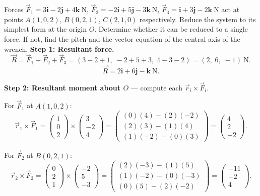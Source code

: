 \documentclass[11pt]{article}
\begin{document}
\begin{exoresolu}
Forces $\vec{F}_1 = 3\mathbf{i} - 2\mathbf{j} + 4\mathbf{k}\ \mathrm{N}$, $\vec{F}_2 = -2\mathbf{i} + 5\mathbf{j} - 3\mathbf{k}\ \mathrm{N}$, $\vec{F}_3 = \mathbf{i} + 3\mathbf{j} - 2\mathbf{k}\ \mathrm{N}$ act at points $A(1,0,2)$, $B(0,2,1)$, $C(2,1,0)$ respectively. Reduce the system to its simplest form at the origin $O$. Determine whether it can be reduced to a single force. If not, find the pitch and the vector equation of the central axis of the wrench.
\tcblower
\textbf{Step 1: Resultant force.}
\[
\vec{R} = \vec{F}_1 + \vec{F}_2 + \vec{F}_3 = (3 - 2 + 1,\; -2 + 5 + 3,\; 4 - 3 - 2) = (2,\; 6,\; -1)\ \mathrm{N}.
\]
\[
\vec{R} = 2\mathbf{i} + 6\mathbf{j} - \mathbf{k}\ \mathrm{N}.
\]

\textbf{Step 2: Resultant moment about $O$} — compute each $\vec{r}_i \times \vec{F}_i$.

For $\vec{F}_1$ at $A(1,0,2)$:
\[
\vec{r}_1 \times \vec{F}_1 =
\begin{pmatrix} 1 \\ 0 \\ 2 \end{pmatrix} \times
\begin{pmatrix} 3 \\ -2 \\ 4 \end{pmatrix} =
\begin{pmatrix} (0)(4)-(2)(-2) \\ (2)(3)-(1)(4) \\ (1)(-2)-(0)(3) \end{pmatrix} =
\begin{pmatrix} 4 \\ 2 \\ -2 \end{pmatrix}.
\]

For $\vec{F}_2$ at $B(0,2,1)$:
\[
\vec{r}_2 \times \vec{F}_2 =
\begin{pmatrix} 0 \\ 2 \\ 1 \end{pmatrix} \times
\begin{pmatrix} -2 \\ 5 \\ -3 \end{pmatrix} =
\begin{pmatrix} (2)(-3)-(1)(5) \\ (1)(-2)-(0)(-3) \\ (0)(5)-(2)(-2) \end{pmatrix} =
\begin{pmatrix} -11 \\ -2 \\ 4 \end{pmatrix}.
\]


\end{exoresolu}
\end{document}
